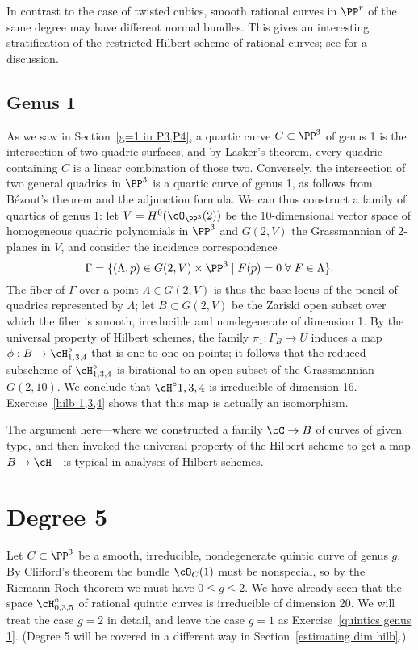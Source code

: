 In contrast to the case of twisted cubics, smooth rational curves in $\PP^r$ of the same degree may have different normal bundles. This gives an interesting stratification of the restricted Hilbert scheme of rational curves; see \cite{MR3778979} for a discussion.

\subsection{Genus 1}
 As we saw in Section~\ref{g=1 in P3,P4}, a quartic curve $C \subset \PP^3$ of genus 1 is the intersection of two quadric surfaces, and by Lasker's theorem, every quadric containing $C$ is a linear combination of those two. Conversely, the intersection of two general quadrics in $\PP^3$ is a quartic curve of genus 1, as follows from B\'ezout's theorem and the adjunction formula. We can thus construct a family of quartics of genus 1: let $V = H^0(\cO_{\PP^3}(2))$ be the 10-dimensional vector space of homogeneous quadric polynomials in $\PP^3$ and $G(2,V)$ the Grassmannian of 2-planes in $V$, and consider the incidence correspondence
$$
\Gamma = \{ (\Lambda, p) \in G(2,V) \times \PP^3 \mid F(p)=0 \; \forall \; F \in \Lambda \}.
$$
The fiber of $\Gamma$ over a point $\Lambda \in G(2,V)$ is thus the base locus of the pencil of quadrics represented by $\Lambda$; let $B \subset G(2,V)$ be the Zariski open subset over which the fiber is smooth, irreducible and nondegenerate of dimension 1. By the universal property of Hilbert schemes, the family $\pi_1 : \Gamma_B \to U$ induces a map $\phi : B \to \cH^\circ_{1,3,4}$ that is one-to-one on points; it follows that the reduced subscheme of $\cH^\circ_{1,3,4}$ is birational to an open subset of the Grassmannian $G(2,10)$. We conclude that $\cH^\circ{1,3,4}$ is irreducible of dimension 16. Exercise~\ref{hilb 1,3,4} shows that this map is actually an isomorphism.

The  argument  here---where we constructed a family $\cC \to B$ of curves of given type, and then invoked the universal property of the Hilbert scheme to get a map $B \to \cH$---is typical in analyses of Hilbert schemes. 

\section{Degree 5}

Let $C \subset \PP^3$ be a smooth, irreducible, nondegenerate quintic curve of genus $g$. By Clifford's theorem the bundle $\cO_C(1)$ must be nonspecial, so  by the Riemann-Roch theorem we must have $0\leq g \leq 2$. We have already seen that the space $\cH^\circ_{0,3,5}$ of rational quintic curves is irreducible of dimension 20. We will treat the case $g=2$ in detail, and leave the case $g=1$ as Exercise~\ref{quintics genus 1}. (Degree 5 will be covered in a different way in Section~\ref{estimating dim hilb}.)


